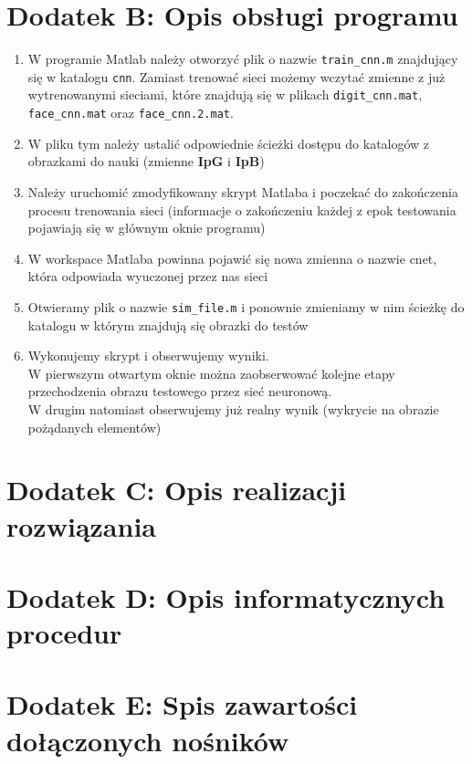 \documentclass[11pt,a4paper]{article}
\begin{document}
\section{Dodatek B: Opis obsługi programu}
 \begin{enumerate}
\item W programie Matlab należy otworzyć plik o nazwie \verb#train_cnn.m# znajdujący się w katalogu \verb#cnn#. Zamiast trenować sieci możemy wczytać zmienne z już wytrenowanymi sieciami, które znajdują się w plikach \verb#digit_cnn.mat#, \verb#face_cnn.mat# oraz \verb#face_cnn.2.mat#.
\item W pliku tym należy ustalić odpowiednie ścieżki dostępu do katalogów z obrazkami do nauki (zmienne  \textbf{IpG} i  \textbf{IpB})
\item Należy uruchomić zmodyfikowany skrypt Matlaba i poczekać do zakończenia procesu trenowania sieci 
(informacje o zakończeniu każdej z epok testowania pojawiają się w głównym oknie programu)
\item W workspace Matlaba powinna pojawić się nowa zmienna o nazwie cnet, która odpowiada wyuczonej przez nas sieci
\item Otwieramy plik o nazwie \verb#sim_file.m# i ponownie zmieniamy w nim ścieżkę do katalogu w którym znajdują się
obrazki do testów
\item Wykonujemy skrypt i obserwujemy wyniki.\\
W pierwszym otwartym oknie można zaobserwować kolejne etapy przechodzenia obrazu testowego przez sieć neuronową.\\
W drugim natomiast obserwujemy już realny wynik (wykrycie na obrazie pożądanych elementów)
 \end{enumerate}

\section{Dodatek C: Opis realizacji rozwiązania}
\section{Dodatek D: Opis informatycznych procedur}
\section{Dodatek E: Spis zawartości dołączonych nośników}
\end{document}
